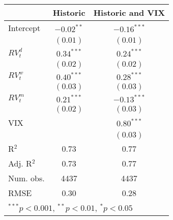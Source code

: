 
\begin{tabular}{l c c }
\hline
 & Historic & Historic and VIX \\
\hline
Intercept    & $-0.02^{**}$ & $-0.16^{***}$ \\
             & $(0.01)$     & $(0.01)$      \\
$RV_{t}^{d}$ & $0.34^{***}$ & $0.24^{***}$  \\
             & $(0.02)$     & $(0.02)$      \\
$RV_{t}^{w}$ & $0.40^{***}$ & $0.28^{***}$  \\
             & $(0.03)$     & $(0.03)$      \\
$RV_{t}^{m}$ & $0.21^{***}$ & $-0.13^{***}$ \\
             & $(0.02)$     & $(0.03)$      \\
VIX          &              & $0.80^{***}$  \\
             &              & $(0.03)$      \\
\hline
R$^2$        & 0.73         & 0.77          \\
Adj. R$^2$   & 0.73         & 0.77          \\
Num. obs.    & 4437         & 4437          \\
RMSE         & 0.30         & 0.28          \\
\hline
\multicolumn{3}{l}{\scriptsize{$^{***}p<0.001$, $^{**}p<0.01$, $^*p<0.05$}}
\end{tabular}
